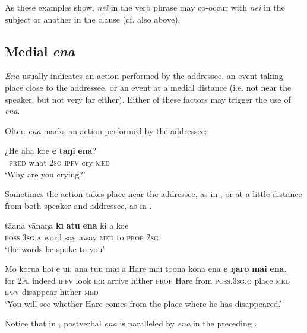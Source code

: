 As these examples show, \textit{nei} in the verb phrase may co-occur with \textit{nei} in the subject or another  in the clause (cf. also  above).

\subsection{Medial \textit{ena}}\label{sec:7.6.3}
\textit{Ena} usually indicates an action performed by the addressee, an event taking place close to the addressee, or an event at a medial distance (i.e. not near the speaker, but not very far either). Either of these factors may trigger the use of \textit{ena}.

Often \textit{ena} marks an action performed by the addressee:

\ea\label{ex:7.160}
\gll ¿He aha koe \textbf{e} \textbf{taŋi} \textbf{ena}? \\
~\textsc{pred} what \textsc{2sg} \textsc{ipfv} cry \textsc{med} \\

\glt
‘Why are you crying?’ \textstyleExampleref{[R229.185]} 
\z

Sometimes the action takes place near the addressee, as in , or at a little distance from both speaker and addressee, as in . 

\ea\label{ex:7.161}
\gll tā{\ꞌ}ana vānaŋa \textbf{kī} \textbf{atu} \textbf{ena} ki a koe \\
\textsc{poss.3sg.a} word say away \textsc{med} to \textsc{prop} \textsc{2sg} \\

\glt 
‘the words he spoke to you’ \textstyleExampleref{[R229.079]} 
\z

\ea\label{ex:7.162}
\gll Mo kōrua ho{\ꞌ}i e u{\ꞌ}i, ana tu{\ꞌ}u mai a Hare mai tō{\ꞌ}ona kona ena \textbf{e} \textbf{ŋaro} \textbf{mai} \textbf{ena}. \\
for \textsc{2pl} indeed \textsc{ipfv} look \textsc{irr} arrive hither \textsc{prop} Hare from \textsc{poss.3sg.o} place \textsc{med} \textsc{ipfv} disappear hither \textsc{med} \\

\glt
‘You will see whether Hare comes from the place where he has disappeared.’ \textstyleExampleref{[R229.276]} 
\z

Notice that in , postverbal \textit{ena} is paralleled by \textit{ena} in the preceding .


